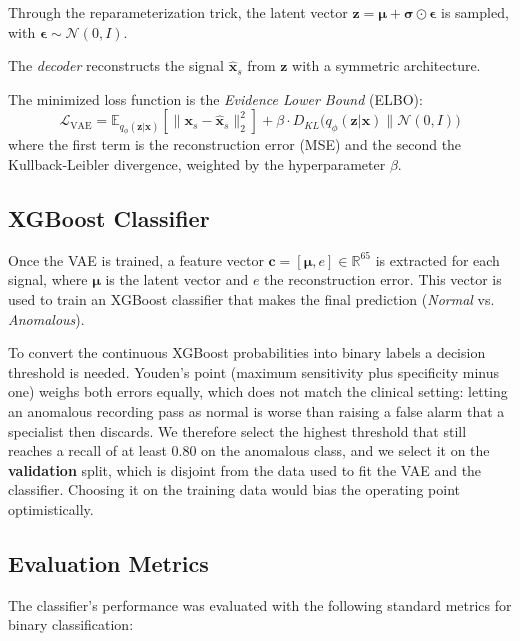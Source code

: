 \documentclass[11pt]{article}
\begin{document}
Through the reparameterization trick, the latent vector $\mathbf{z} = \boldsymbol{\mu} + \boldsymbol{\sigma} \odot \boldsymbol{\epsilon}$ is sampled, with $\boldsymbol{\epsilon} \sim \mathcal{N}(0, I)$.


\noindent The \textit{decoder} reconstructs the signal $\hat{\mathbf{x}}_s$ from $\mathbf{z}$ with a symmetric architecture.


The minimized loss function is the \textit{Evidence Lower Bound} (ELBO):
\vspace{-0.4em}
\begin{equation}
\mathcal{L}_{\mathrm{VAE}} = \mathbb{E}_{q_\phi(\mathbf{z}|\mathbf{x})}[\|\mathbf{x}_s - \hat{\mathbf{x}}_s\|_2^2] + \beta \cdot D_{KL}\bigl(q_\phi(\mathbf{z}|\mathbf{x}) \parallel \mathcal{N}(0,I)\bigr)
\end{equation}
\vspace{-0.2em}
where the first term is the reconstruction error (MSE) and the second the Kullback-Leibler divergence, weighted by the hyperparameter $\beta$.

\vspace{-0.1em}

\subsection{XGBoost Classifier}
Once the VAE is trained, a feature vector $\mathbf{c} = [\boldsymbol{\mu}, e] \in \mathbb{R}^{65}$ is extracted for each signal, where $\boldsymbol{\mu}$ is the latent vector and $e$ the reconstruction error. This vector is used to train an XGBoost classifier that makes the final prediction (\textit{Normal} vs. \textit{Anomalous}).

To convert the continuous XGBoost probabilities into binary labels a decision threshold is needed. Youden's point (maximum sensitivity plus specificity minus one) weighs both errors equally, which does not match the clinical setting: letting an anomalous recording pass as normal is worse than raising a false alarm that a specialist then discards. We therefore select the highest threshold that still reaches a recall of at least $0.80$ on the anomalous class, and we select it on the \textbf{validation} split, which is disjoint from the data used to fit the VAE and the classifier. Choosing it on the training data would bias the operating point optimistically.

\subsection{Evaluation Metrics}
The classifier's performance was evaluated with the following standard metrics for binary classification:
\end{document}
